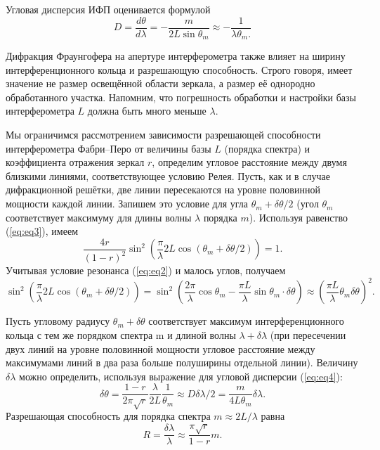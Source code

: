 \documentclass[12pt]{article}
\begin{document}
    Угловая дисперсия ИФП оценивается формулой
    \begin{equation}
        D = \frac{d\theta}{d\lambda} = -\frac{m}{2L\sin\theta_m} \approx -\frac{1}{\lambda \theta_m.}
        \label{eq:eq4}
    \end{equation}

    Дифракция Фраунгофера на апертуре интерферометра также влияет на ширину интерференционного кольца
    и разрешающую способность.
    Строго говоря, имеет значение не размер освещённой области зеркала,
    а размер её однородно обработанного участка.
    Напомним, что погрешность обработки и настройки базы интерферометра $L$
    должна быть много меньше $\lambda$.

    Мы ограничимся рассмотрением зависимости разрешающей способности интерферометра Фабри–Перо
    от величины базы $L$ (порядка спектра) и коэффициента отражения зеркал $r$,
    определим угловое расстояние между двумя близкими линиями, соответствующее условию Релея.
    Пусть, как и в случае дифракционной решётки, две линии пересекаются на уровне
    половинной мощности каждой линии.
    Запишем это условие для угла $\theta_m +\delta\theta/2$
    (угол $\theta_m$ соответствует максимуму для длины волны $\lambda$ порядка $m$).
    Используя равенство (\ref{eq:eq3}), имеем
    \[\frac{4r}{(1 - r)^2} \sin^2\left(\frac{\pi}{\lambda}2L\cos(\theta_m + \delta \theta/2)\right) = 1.\]
    Учитывая условие резонанса (\ref{eq:eq2}) и малось углов, получаем
    \[\sin^2\left(\frac{\pi}{\lambda}2L\cos(\theta_m + \delta \theta/2)\right) =
    \sin^2 \left(\frac{2\pi}{\lambda}\cos\theta_m -
    \frac{\pi L}{\lambda}\sin\theta_m \cdot \delta \theta\right) \approx
    \left( \frac{\pi L}{\lambda} \theta_m \delta \theta \right)^2.\]

    Пусть угловому радиусу $\theta_m + \delta\theta$ соответствует максимум интерференционного кольца
    с тем же порядком спектра m и длиной волны $\lambda+\delta\lambda$
    (при пересечении двух линий на уровне половинной мощности угловое расстояние
    между максимумами линий в два раза больше полуширины отдельной линии).
    Величину $\delta \lambda$ можно определить, используя выражение для угловой дисперсии (\ref{eq:eq4}):
    \[\delta \theta = \frac{1- r}{2\pi \sqrt{r}} \frac{\lambda}{2L}\frac{1}{\theta_m}\approx
    D\delta\lambda/2 = \frac{m}{4L\theta_m} \delta\lambda.\]
    Разрешающая способность для порядка спектра $m \approx 2L/\lambda$ равна
    \begin{equation}
        R = \frac{\delta \lambda}{\lambda} \approx \frac{\pi \sqrt{r}}{1 - r}m.
        \label{eq:eq5}
    \end{equation}
\end{document}
